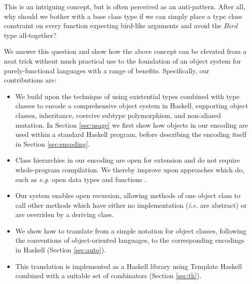 This is an intriguing concept, but is often perceived as an anti-pattern. After all, why should we bother with a base class type if we can simply place a type class constraint on every function expecting bird-like arguments and avoid the $\mathit{Bird}$ type all-together?

We answer this question and show how the above concept can be elevated from a neat trick without much practical use to the foundation of an object system for purely-functional languages with a range of benefits. Specifically, our contributions are:
\begin{itemize}
    \item We build upon the technique of using existential types combined with type classes to encode a comprehensive object system in Haskell, supporting object classes, inheritance, coercive subtype polymorphism, and non-aliased mutation. In Section \ref{sec:usage} we first show how objects in our encoding are used within a standard Haskell program, before describing the encoding itself in Section \ref{sec:encoding}.
    \item Class hierarchies in our encoding are open for extension and do not require whole-program compilation. We thereby improve upon approaches which do, such as \emph{e.g.} open data types and functions \cite{loh2006open}.
    \item Our system enables open recursion, allowing methods of one object class to call other methods which have either no implementation (\emph{i.e.} are abstract) or are overriden by a deriving class.
    \item We show how to translate from a simple notation for object classes, following the conventions of object-oriented languages, to the corresponding encodings in Haskell (Section \ref{sec:auto}).
    \item This translation is implemented as a Haskell library using Template Haskell combined with a suitable set of combinators (Section \ref{sec:th}).
\end{itemize}